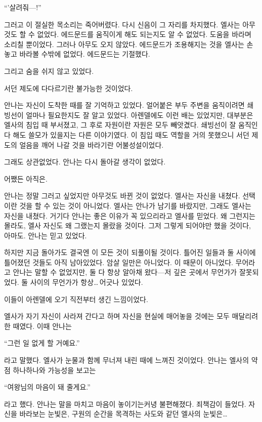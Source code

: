 ``'살려줘—!''

그러고 이 절실한 목소리는 죽어버렸다. 다시 신음이 그 자리를 차지했다. 엘사는 아무것도 할 수 없었다. 에드문드를 움직이게 해도 되는지도 알 수 없었다. 도움을 바라며 소리칠 뿐이었다. 그러나 아무도 오지 않았다. 에드문드가 조용해지는 것을 엘사는 손 놓고 바라볼 수밖에 없었다. 에드문드는 기절했다.

그리고 숨을 쉬지 않고 있었다.

\textbreak

서던 제도에 다다르기란 불가능한 것이었다.

안나는 자신이 도착한 때를 잘 기억하고 있었다. 얼어붙은 부두 주변을 움직이려면 쇄빙선이 얼마나 필요한지도 잘 알고 있었다. 아렌델에도 이런 배는 있었지만, 대부분은 엘사의 침입 때 부서졌고, 그 후로 자원이란 자원은 모두 빼앗겼다. 쇄빙선이 잘 움직인다 해도 쓸모가 있을지는 다른 이야기였다. 이 침입 때도 역할을 거의 못했으니 서던 제도의 얼음을 깨어 나갈 것을 바라기란 어불성설이었다.

그래도 상관없었다. 안나는 다시 돌아갈 생각이 없었다.

어쨌든 아직은.

안나는 정말 그러고 싶었지만 아무것도 바뀐 것이 없었다. 엘사는 자신을 내쳤다. 선택이란 것을 할 수 있는 것이 아니었다. 엘사는 안나가 남기를 바랐지만, 그래도 엘사는 자신을 내쳤다. 거기다 안나는 좋은 이유가 꼭 있으리라고 엘사를 믿었다. 왜 그런지는 몰라도, 엘사 자신도 왜 그랬는지 몰랐을 것이다. 그저 그렇게 되어야만 했을 것이다, 아마도. 안나는 믿고 있었다.

하지만 지금 돌아가도 결국엔 이 모든 것이 되풀이될 것이다. 틀어진 일들과 둘 사이에 틀어졌던 것들도 아직 남아있었다. 암살 일만은 아니었다. 이 때문이 아니었다. 무어라고 안나는 말할 수 없었지만, 둘 다 항상 알아채 왔다—저 깊은 곳에서 무언가가 잘못되었다. 둘 사이의 무언가가 항상\ldots\,어긋나 있었다.

이들이 아렌델에 오기 직전부터 생긴 느낌이었다.

엘사가 자기 자신이 사라져 간다고 하며 자신을 현실에 매어놓을 것에는 모두 매달리려 한 때였다. 이때 안나는

``그런 일 없게 할 거예요.''

라고 말했다. 엘사가 눈물과 함께 무너져 내린 때에 느껴진 것이었다. 안나는 엘사의 약점 하나하나와 가능성을 보고는

``여왕님의 마음이 돼 줄게요.''

라고 했다. 안나는 말을 마치고 마음이 놓이기는커녕 불편해졌다. 죄책감이 들었다. 자신을 바라보는 눈빛은, 구원의 순간을 목격하는 사도와 같던 엘사의 눈빛은\ldots

